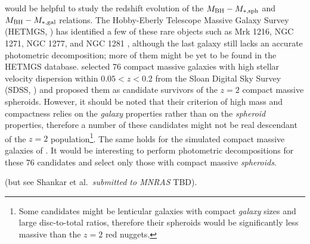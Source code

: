 would be helpful to study the redshift evolution of the $M_{\rm BH} - M_{\rm *,sph}$ 
and $M_{\rm BH} - M_{\rm *,gal}$ relations. 
The Hobby-Eberly Telescope Massive Galaxy Survey (HETMGS, \citealt{vandenBosch2015}) 
has identified a few of these rare objects 
such as Mrk 1216, NGC 1271, NGC 1277, and NGC 1281 \citep{yildirim2016}, 
although the last galaxy still lacks an accurate photometric decomposition; 
more of them might be yet to be found in the HETMGS database. 
\citet{saulder2015} selected 76 compact massive galaxies with high stellar velocity dispersion within $0.05 < z < 0.2$ 
from the Sloan Digital Sky Survey (SDSS, \citealt{abazajian2009}) 
and proposed them as candidate survivors of the $z=2$ compact massive spheroids. 
However, it should be noted that their criterion of high mass and compactness relies on the \emph{galaxy} properties 
rather than on the \emph{spheroid} properties, 
therefore a number of these candidates might not be real descendant of the $z=2$ population\footnote{Some 
candidates might be lenticular galaxies with compact \emph{galaxy} sizes and large disc-to-total ratios, 
therefore their spheroids would be significantly less massive than the $z=2$ red nuggets. }. 
The same holds for the simulated compact massive galaxies of \citet{wellons2016}. 
It would be interesting to perform photometric decompositions for these 76 candidates 
and select only those with compact massive \emph{spheroids}. 





(but see Shankar et al.~\emph{submitted to MNRAS} TBD). \\




 
